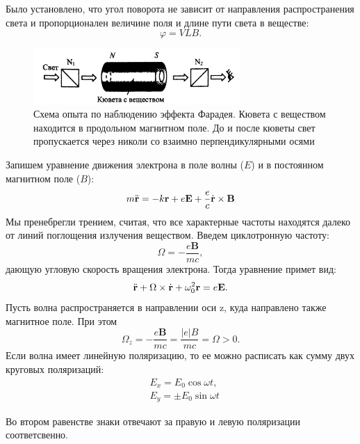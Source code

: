 \documentclass[12pt,a4paper]{article}
\begin{document}
Было установлено, что угол поворота не зависит от направления распространения света и пропорционален величине поля и длине пути света в веществе:
 \begin{equation*}
     \varphi = VLB.
 \end{equation*}
\begin{figure}[H]
\begin{center}
\includegraphics[width = 0.7\textwidth]{оф.PNG}
\caption{Схема опыта по наблюдению эффекта Фарадея. Кювета с веществом находится в продольном магнитном поле. До и после кюветы свет пропускается через николи со взаимно перпендикулярными осями}
\end{center}
\end{figure}
 Запишем уравнение движения электрона в поле волны ($E$) и в постоянном магнитном поле ($B$):
 \begin{equation*}
     m\Ddot{\textbf{r}} = -k\textbf{r} + e\textbf{E} + \frac{e}{c}\Dot{\textbf{r}} \times \textbf{B}
 \end{equation*}
Мы пренебрегли трением, считая, что все характерные частоты находятся далеко от линий поглощения излучения веществом. Введем циклотронную частоту:
 \begin{equation*}
     \Omega = -\frac{e\textbf{B}}{mc},
 \end{equation*}
дающую угловую скорость вращения электрона. Тогда уравнение примет вид:
 \begin{equation*}
     \Ddot{\textbf{r}}  + \Omega \times\Dot{\textbf{r}} + \omega_{0}^2 \textbf{r} = e \textbf{E}.
 \end{equation*}
 Пусть волна распространяется в направлении оси z, куда направлено также магнитное поле. При этом
  \begin{equation*}
  \Omega_{z} = -\frac{e\textbf{B}}{mc} = \frac{|e|B}{mc} = \Omega > 0.
 \end{equation*}
 Если волна имеет линейную поляризацию, то ее можно расписать как сумму двух круговых поляризаций:
  \begin{align*}
     &E_x = E_0 \cos{\omega t},\\
     &E_y = \pm E_0 \sin{\omega t}
  \end{align*}
    
 
 Во втором равенстве знаки отвечают за правую и левую поляризации соответсвенно.
 
\end{document}
